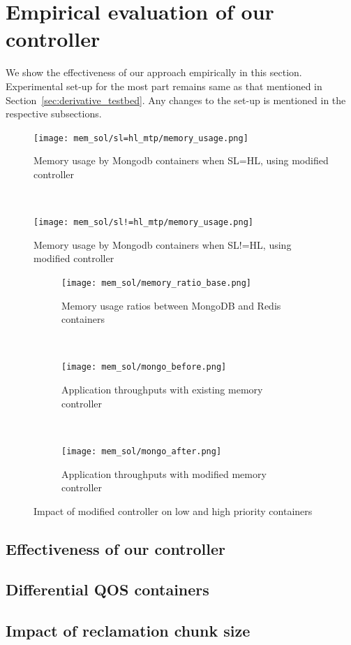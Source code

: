   
  \section{Empirical evaluation of our controller}
       
    We show the effectiveness of our approach empirically in this section. Experimental set-up for the most part remains same as that 
mentioned in Section~\ref{sec:derivative_testbed}. Any changes to the set-up is mentioned in the respective subsections. 

\begin{figure}
	  \texttt{[image: mem\_sol/sl=hl\_mtp/memory\_usage.png]}
	  \caption{\footnotesize Memory usage by Mongodb containers when SL=HL, using modified controller}
	  \label{mem_sol_sl=hl_mongo}
\end{figure}
	~
\begin{figure}
	  \texttt{[image: mem\_sol/sl!=hl\_mtp/memory\_usage.png]}
	  \caption{\footnotesize Memory usage by Mongodb containers when SL!=HL, using modified controller}
	  \label{mem_sol_sl!=hl_mongo}
\end{figure}	
	

\begin{figure}
	\begin{subfigure}{0.33\textwidth}
	  \texttt{[image: mem\_sol/memory\_ratio\_base.png]}
	  \caption{\footnotesize Memory usage ratios between MongoDB and Redis containers}
	  \label{mem_sol_ratios}
	\end{subfigure}
	~
	\begin{subfigure}{0.33\textwidth}
	  \texttt{[image: mem\_sol/mongo\_before.png]}
	  \caption{\footnotesize Application throughputs with existing memory controller}
	  \label{throughput_mongo_before}
	\end{subfigure}
	~
	\begin{subfigure}{0.33\textwidth}
	  \texttt{[image: mem\_sol/mongo\_after.png]}
	  \caption{\footnotesize Application throughputs with modified memory controller}
	  \label{throughput_mongo_after}
	\end{subfigure}	
  \label{fig:mem_sol}
\caption{Impact of modified controller on low and high priority containers}
\end{figure}

  
    \subsection{Effectiveness of our controller}
    
    \subsection{Differential QOS containers}
    
    \subsection{Impact of reclamation chunk size}
    